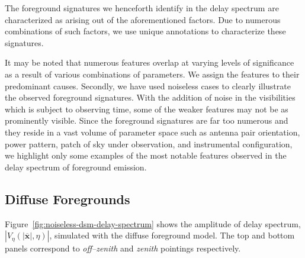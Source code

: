 \documentclass[preprint2,iop,numberedappendix]{emulateapj}
\begin{document}
The foreground signatures we henceforth identify in the delay spectrum are characterized as arising out of the aforementioned factors. Due to numerous combinations of such factors, we use unique annotations to characterize these signatures.

It may be noted that numerous features overlap at varying levels of significance as a result of various combinations of parameters. We assign the features to their predominant causes. Secondly, we have used noiseless cases to clearly illustrate the observed foreground signatures. With the addition of noise in the visibilities which is subject to observing time, some of the weaker features may not be as prominently visible. Since the foreground signatures are far too numerous and they reside in a vast volume of parameter space such as antenna pair orientation, power pattern, patch of sky under observation, and instrumental configuration, we highlight only some examples of the most notable features observed in the delay spectrum of foreground emission.

\subsection{Diffuse Foregrounds}\label{sec:diffuse}

Figure~\ref{fig:noiseless-dsm-delay-spectrum} shows the amplitude of delay spectrum, $|V_\eta(|\overline{\mathbf{x}}|,\eta)|$, simulated with the diffuse foreground model. The top and bottom panels correspond to {\it off--zenith} and {\it zenith} pointings respectively. 
\end{document}
